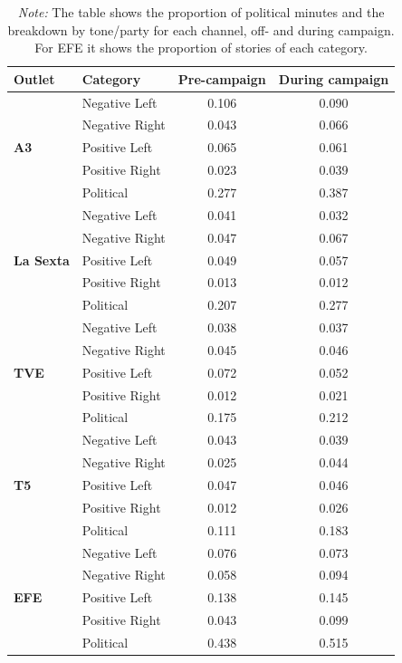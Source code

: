 \documentclass[12pt]{article}
\begin{document}
	\begin{table}[!htbp]
		\centering
		\caption{Proportion of Political Content and Sentiment by Channel}
		\begin{tabular}{llcc}
			\toprule
			\textbf{Outlet} & \textbf{Category} & \textbf{Pre-campaign} & \textbf{During campaign} \\
			\midrule
			\midrule
			\multirow{5}{*}{\textbf{A3}}& Negative Left & 0.106 & 0.090 \\
			& Negative Right & 0.043 & 0.066 \\
			& Positive Left & 0.065 & 0.061 \\
			& Positive Right & 0.023 & 0.039 \\
			& Political & 0.277 & 0.387 \\
			\midrule
			\multirow{5}{*}{\textbf{La Sexta}}& Negative Left & 0.041 & 0.032 \\
			& Negative Right & 0.047 & 0.067 \\
			& Positive Left & 0.049 & 0.057 \\
			& Positive Right & 0.013 & 0.012 \\
			& Political & 0.207 & 0.277 \\
			\midrule
			\multirow{5}{*}{\textbf{TVE}}& Negative Left & 0.038 & 0.037 \\
			& Negative Right & 0.045 & 0.046 \\
			& Positive Left & 0.072 & 0.052 \\
			& Positive Right & 0.012 & 0.021 \\
			& Political & 0.175 & 0.212 \\
			\midrule
			\multirow{5}{*}{\textbf{T5}}& Negative Left & 0.043 & 0.039 \\
			& Negative Right & 0.025 & 0.044 \\
			& Positive Left & 0.047 & 0.046 \\
			& Positive Right & 0.012 & 0.026 \\
			& Political & 0.111 & 0.183 \\
			\bottomrule
				\multirow{5}{*}{\textbf{ EFE}} & Negative Left & 0.076 & 0.073 \\
			& Negative Right & 0.058 & 0.094\\
			& Positive Left & 0.138 & 0.145 \\
			& Positive Right & 0.043 & 0.099\\
			& Political & 0.438 & 0.515 \\
			\bottomrule
			
		\end{tabular}
		\caption*{\small \textit{Note:} The table shows the proportion of political minutes and the breakdown by tone/party for each channel, off- and during campaign. For EFE it shows the proportion of stories of each category. }
		\label{tab:political_sentiment_types}
	\end{table}
	
\end{document}
